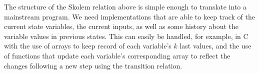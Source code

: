 The structure of the Skolem relation above is simple enough to translate into a
mainstream program. We need implementations that are able to keep track of the
current state variables, the current inputs, as well as some history
about the variable values in previous states. This can easily be handled, for
example, in C with the use of arrays to keep record of each variable's $k$ last
values, and the use of functions that update each variable's corresponding array
to reflect the changes following a new step using the transition relation.
